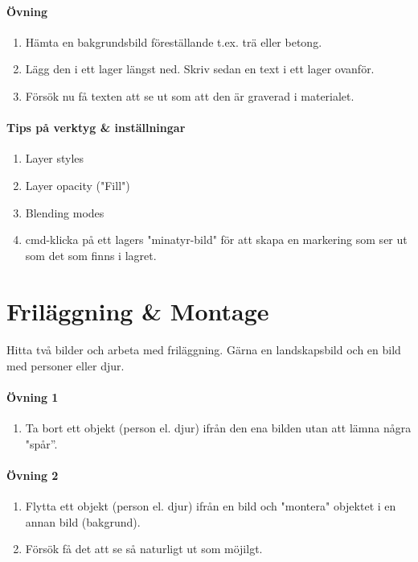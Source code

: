 \documentclass{article}
\begin{document}
    \paragraph{Övning}
      \begin{enumerate}
        \item Hämta en bakgrundsbild föreställande t.ex. trä eller betong.
        \item Lägg den i ett lager längst ned. Skriv sedan en text i ett lager ovanför.
        \item Försök nu få texten att se ut som att den är graverad i materialet.
      \end{enumerate}

    \paragraph{Tips på verktyg \& inställningar}
      \begin{enumerate}
        \item Layer styles
        \item Layer opacity ("Fill")
        \item Blending modes
        \item cmd-klicka på ett lagers "minatyr-bild" för att skapa en markering som ser ut som det som finns i lagret.
      \end{enumerate}
  



  \section{Friläggning \& Montage}
    \paragraph{}
    Hitta två bilder och arbeta med friläggning. Gärna en landskapsbild och en bild med personer eller djur.

    \paragraph{Övning 1}
      \begin{enumerate}
        \item Ta bort ett objekt (person el. djur) ifrån den ena bilden utan att lämna några "spår''.
      \end{enumerate}

      \paragraph{Övning 2}
      \begin{enumerate}
        \item Flytta ett objekt (person el. djur) ifrån en bild och "montera" objektet i en annan bild (bakgrund).
        \item Försök få det att se så naturligt ut som möjilgt.
      \end{enumerate}
\end{document}
